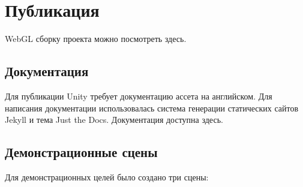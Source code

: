 ﻿\section{Публикация}

WebGL сборку проекта можно посмотреть здесь\cite{s9}.

\subsection{Документация}
Для публикации Unity требует документацию ассета на английском. Для написания документации использовалась система генерации статических сайтов Jekyll\cite{s11} и тема Just the Docs\cite{s12}. Документация доступна здесь\cite{s13}.


\subsection{Демонстрационные сцены}
Для демонстрационных целей было создано три сцены:

